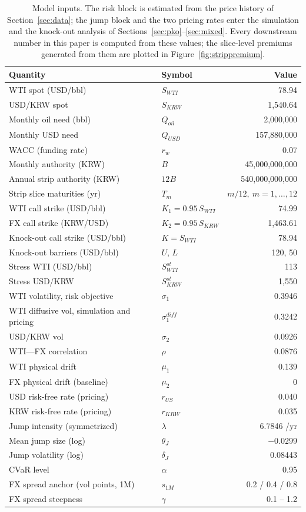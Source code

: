 \documentclass[11pt,a4paper]{article}
\begin{document}
\begin{table}[h]
\centering
\small
\begin{tabular}{llr}
\toprule
Quantity & Symbol & Value \\
\midrule
WTI spot (USD/bbl) & $S_{WTI}$ & 78.94 \\
USD/KRW spot & $S_{KRW}$ & 1{,}540.64 \\
Monthly oil need (bbl) & $Q_{oil}$ & 2{,}000{,}000 \\
Monthly USD need & $Q_{USD}$ & 157{,}880{,}000 \\
WACC (funding rate) & $r_w$ & 0.07 \\
Monthly authority (KRW) & $B$ & 45{,}000{,}000{,}000 \\
Annual strip authority (KRW) & $12B$ & 540{,}000{,}000{,}000 \\
Strip slice maturities (yr) & $T_m$ & $m/12,\ m=1,\dots,12$ \\
WTI call strike (USD/bbl) & $K_1 = 0.95\,S_{WTI}$ & 74.99 \\
FX call strike (KRW/USD) & $K_2 = 0.95\,S_{KRW}$ & 1{,}463.61 \\
Knock-out call strike (USD/bbl) & $K = S_{WTI}$ & 78.94 \\
Knock-out barriers (USD/bbl) & $U$, $L$ & 120, 50 \\
Stress WTI (USD/bbl) & $S^{st}_{WTI}$ & 113 \\
Stress USD/KRW & $S^{st}_{KRW}$ & 1{,}550 \\
WTI volatility, risk objective & $\sigma_1$ & 0.3946 \\
WTI diffusive vol, simulation and pricing & $\sigma_1^{diff}$ & 0.3242 \\
USD/KRW vol & $\sigma_2$ & 0.0926 \\
WTI---FX correlation & $\rho$ & 0.0876 \\
WTI physical drift & $\mu_1$ & 0.139 \\
FX physical drift (baseline) & $\mu_2$ & 0 \\
USD risk-free rate (pricing) & $r_{US}$ & 0.040 \\
KRW risk-free rate (pricing) & $r_{KRW}$ & 0.035 \\
Jump intensity (symmetrized) & $\lambda$ & 6.7846 /yr \\
Mean jump size (log) & $\theta_J$ & $-0.0299$ \\
Jump volatility (log) & $\delta_J$ & 0.08443 \\
CVaR level & $\alpha$ & 0.95 \\
FX spread anchor (vol points, 1M) & $s_{1M}$ & 0.2 / 0.4 / 0.8 \\
FX spread steepness & $\gamma$ & 0.1 -- 1.2 \\
\bottomrule
\end{tabular}
\caption{Model inputs. The risk block is estimated from the price history of Section~\ref{sec:data}; the jump block and the two pricing rates enter the simulation and the knock-out analysis of Sections~\ref{sec:pko}--\ref{sec:mixed}. Every downstream number in this paper is computed from these values; the slice-level premiums generated from them are plotted in Figure~\ref{fig:strippremium}.}
\label{tab:inputs}
\end{table}
\end{document}
